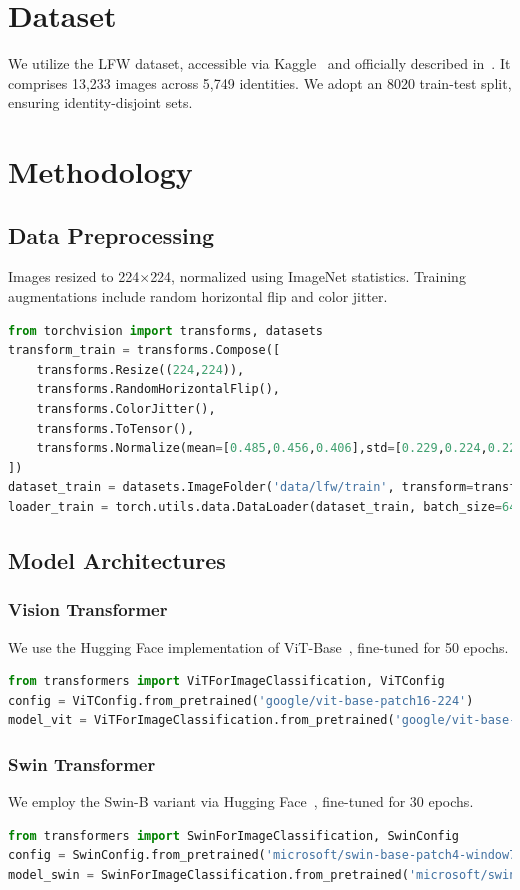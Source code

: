 \documentclass[twocolumn]{IEEEtran}
\begin{document}
\section{Dataset}
We utilize the LFW dataset, accessible via Kaggle~\cite{kaggle_lfw} and officially described in~\cite{huang2008lfw}. It comprises 13,233 images across 5,749 identities. We adopt an 80\/20 train-test split, ensuring identity-disjoint sets.

\section{Methodology}
\subsection{Data Preprocessing}
Images resized to 224\(\times\)224, normalized using ImageNet statistics. Training augmentations include random horizontal flip and color jitter.
\begin{lstlisting}[language=Python, caption=DataLoader and Transforms]
from torchvision import transforms, datasets
transform_train = transforms.Compose([
    transforms.Resize((224,224)),
    transforms.RandomHorizontalFlip(),
    transforms.ColorJitter(),
    transforms.ToTensor(),
    transforms.Normalize(mean=[0.485,0.456,0.406],std=[0.229,0.224,0.225])
])
dataset_train = datasets.ImageFolder('data/lfw/train', transform=transform_train)
loader_train = torch.utils.data.DataLoader(dataset_train, batch_size=64, shuffle=True)
\end{lstlisting}

\subsection{Model Architectures}
\subsubsection{Vision Transformer}
We use the Hugging Face implementation of ViT-Base~\cite{huggingface_vit}, fine-tuned for 50 epochs.
\begin{lstlisting}[language=Python, caption=ViT Model Initialization]
from transformers import ViTForImageClassification, ViTConfig
config = ViTConfig.from_pretrained('google/vit-base-patch16-224')
model_vit = ViTForImageClassification.from_pretrained('google/vit-base-patch16-224', config=config)
\end{lstlisting}

\subsubsection{Swin Transformer}
We employ the Swin-B variant via Hugging Face~\cite{huggingface_swin}, fine-tuned for 30 epochs.
\begin{lstlisting}[language=Python, caption=Swin Transformer Initialization]
from transformers import SwinForImageClassification, SwinConfig
config = SwinConfig.from_pretrained('microsoft/swin-base-patch4-window7-224')
model_swin = SwinForImageClassification.from_pretrained('microsoft/swin-base-patch4-window7-224', config=config)
\end{lstlisting}
\end{document}
